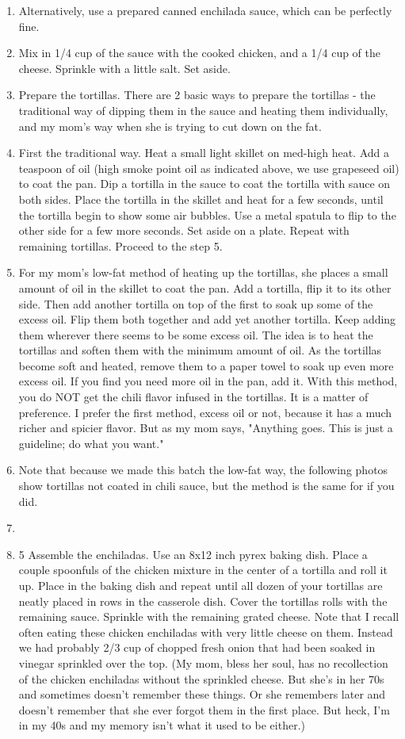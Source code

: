 \documentclass[11pt, twoside, openany]{book}
\begin{document}
\begin{minipage}[t]{\linewidth}
\begin{enumerate}
\item Alternatively, use a prepared canned enchilada sauce, which can be perfectly fine.
\item Mix in 1/4 cup of the sauce with the cooked chicken, and a 1/4 cup of the cheese. Sprinkle with a little salt. Set aside.
\item Prepare the tortillas. There are 2 basic ways to prepare the tortillas - the traditional way of dipping them in the sauce and heating them individually, and my mom's way when she is trying to cut down on the fat.
\item First the traditional way. Heat a small light skillet on med-high heat. Add a teaspoon of oil (high smoke point oil as indicated above, we use grapeseed oil) to coat the pan. Dip a tortilla in the sauce to coat the tortilla with sauce on both sides. Place the tortilla in the skillet and heat for a few seconds, until the tortilla begin to show some air bubbles. Use a metal spatula to flip to the other side for a few more seconds. Set aside on a plate. Repeat with remaining tortillas. Proceed to the step 5.
\item For my mom's low-fat method of heating up the tortillas, she places a small amount of oil in the skillet to coat the pan. Add a tortilla, flip it to its other side. Then add another tortilla on top of the first to soak up some of the excess oil. Flip them both together and add yet another tortilla. Keep adding them wherever there seems to be some excess oil. The idea is to heat the tortillas and soften them with the minimum amount of oil. As the tortillas become soft and heated, remove them to a paper towel to soak up even more excess oil. If you find you need more oil in the pan, add it. With this method, you do NOT get the chili flavor infused in the tortillas. It is a matter of preference. I prefer the first method, excess oil or not, because it has a much richer and spicier flavor. But as my mom says, "Anything goes. This is just a guideline; do what you want." 
\item Note that because we made this batch the low-fat way, the following photos show tortillas not coated in chili sauce, but the method is the same for if you did.
\item  
\item 5 Assemble the enchiladas. Use an 8x12 inch pyrex baking dish. Place a couple spoonfuls of the chicken mixture in the center of a tortilla and roll it up. Place in the baking dish and repeat until all dozen of your tortillas are neatly placed in rows in the casserole dish. Cover the tortillas rolls with the remaining sauce. Sprinkle with the remaining grated cheese. Note that I recall often eating these chicken enchiladas with very little cheese on them. Instead we had probably 2/3 cup of chopped fresh onion that had been soaked in vinegar sprinkled over the top. (My mom, bless her soul, has no recollection of the chicken enchiladas without the sprinkled cheese. But she's in her 70s and sometimes doesn't remember these things. Or she remembers later and doesn't remember that she ever forgot them in the first place. But heck, I'm in my 40s and my memory isn't what it used to be either.)

\end{enumerate}
\end{minipage}
\end{document}
